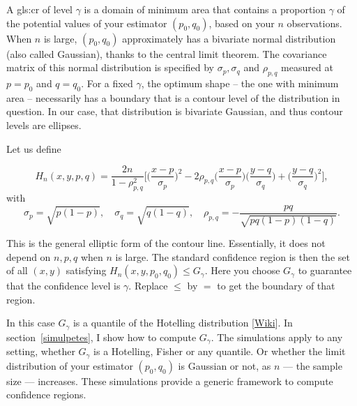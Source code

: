 \documentclass[oneside,10pt]{book}
\begin{document}
A \gls{gls:cr} of level $\gamma$ is a domain of minimum area that contains a proportion $\gamma$ of the potential values of your estimator $(p_0, q_0)$, based on your $n$ observations. When $n$ is large, $(p_0, q_0)$ approximately has a \textcolor{index}{bivariate normal distribution} (also called Gaussian), thanks to the
\textcolor{index}{central limit theorem}. The \textcolor{index}{covariance matrix} of this normal distribution is specified by $\sigma_p, \sigma_q$ and $\rho_{p,q}$ measured at $p = p_0$ and $q = q_0$. For a fixed $\gamma$, the optimum shape -- the one with minimum area -- necessarily has a boundary that is a contour level of the distribution in question. In our case, that distribution is bivariate Gaussian, and thus contour levels are ellipses.

\noindent Let us define

\begin{equation}
H_n(x,y,p,q)=\frac{2n}{1-\rho_{p,q}^2}
\Big[\Big( \frac{x-p}{\sigma_p}\Big)^2
-2\rho_{p,q}\Big(\frac{x-p}{\sigma_p}\Big)\Big(\frac{y-q}{\sigma_q}\Big)
+ \Big(\frac{y-q}{\sigma_q}\Big)^2\Big],\label{gauss2d}
\end{equation}
with
\begin{equation}
\sigma_p
=\sqrt{p(1-p)},
\quad \sigma_q=\sqrt{q(1-q)},
\quad \rho_{p,q}=-\frac{pq}{\sqrt{pq(1-p)(1-q)}}.\label{cvcxcc}
\end{equation}


This is the general elliptic form of the contour line. Essentially, it does not depend on $n, p, q$ when $n$ is large. The standard confidence region is then the set of all $(x, y)$ satisfying $H_n(x, y, p_0, q_0)\leq G_\gamma$. Here you choose $G_\gamma$ to guarantee that the \textcolor{index}{confidence level} is $\gamma$. Replace $\leq$ by $=$ to get the boundary of that region.

In this case $G_\gamma$ is a \textcolor{index}{quantile} of the \textcolor{index}{Hotelling distribution} [\href{https://en.wikipedia.org/wiki/Hotelling\%27s_T-squared_distribution}{Wiki}].
In section~\ref{simulpetes}, I show how to compute $G_\gamma$. The simulations apply to any setting, whether $G_\gamma$ is a Hotelling, Fisher or any quantile. Or whether the limit distribution of your estimator $(p_0, q_0)$ is Gaussian or not, as $n$ — the sample size — increases. These simulations provide a generic framework to compute confidence regions.
\end{document}
